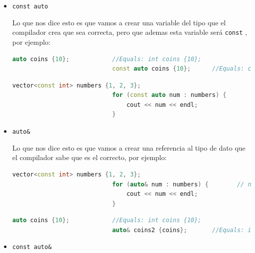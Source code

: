 \documentclass[12pt, fleqn]{report}                             %
\theoremstyle{break}                                            %
\newcommand{\textCode}[1]  { \texttt{#1} }                      %
\begin{document}
                \begin{itemize}
                    \item \textCode{const auto}

                        Lo que nos dice esto es que vamos a crear una variable del tipo que el compilador crea
                        que sea correcta, pero que ademas esta variable será \textCode{const}, por ejemplo:
                        \begin{lstlisting}[language=C++, gobble=28]
                            auto coins {10};            //Equals: int coins {10};
                            const auto coins {10};      //Equals: const int coins {10};
                        \end{lstlisting}

                        \begin{lstlisting}[language=C++, gobble=28]
                            vector<const int> numbers {1, 2, 3};
                            for (const auto num : numbers) {        // num is const int
                                cout << num << endl;
                            }
                        \end{lstlisting}

                    \item \textCode{auto\&}
                    
                        Lo que nos dice esto es que vamos a crear una referencia al tipo de dato
                        que el compilador sabe que es el correcto, por ejemplo:
                        \begin{lstlisting}[language=C++, gobble=28]
                            vector<const int> numbers {1, 2, 3};
                            for (auto& num : numbers) {        // num is int&
                                cout << num << endl;
                            }
                        \end{lstlisting}

                        \begin{lstlisting}[language=C++, gobble=28]
                            auto coins {10};            //Equals: int coins {10};
                            auto& coins2 {coins};       //Equals: int& coins2 {coins};
                        \end{lstlisting}

                    \item \textCode{const auto\&}
                    

\end{itemize}
\end{document}
